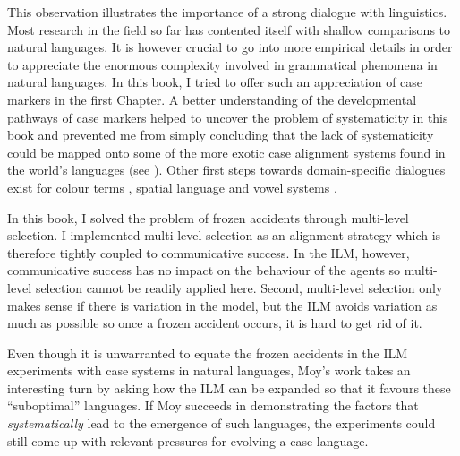 This observation illustrates the importance of a strong dialogue with linguistics. Most research in the field so far has contented itself with shallow comparisons to natural languages. It is however crucial to go into more empirical details in order to appreciate the enormous complexity involved in grammatical phenomena in natural languages. In this book, I tried to offer such an appreciation of case markers in the first Chapter. A better understanding of the developmental pathways of case markers helped to uncover the problem of systematicity in this book and prevented me from simply concluding that the lack of systematicity could be mapped onto some of the more exotic case alignment systems found in the world's languages (see ). Other first steps towards domain-specific dialogues exist for colour terms \citep{steels05coordinating}, spatial language \citep{loetzsch08typological} and vowel systems \citep{deboer99self}.

In this book, I solved the problem of frozen accidents through multi-level selection. I implemented multi-level selection as an alignment strategy which is therefore tightly coupled to communicative success. In the ILM, however, communicative success has no impact on the behaviour of the agents so multi-level selection cannot be readily applied here. Second, multi-level selection only makes sense if there is variation in the model, but the ILM avoids variation as much as possible so once a frozen accident occurs, it is hard to get rid of it.
 
\largerpage[-2]
Even though it is unwarranted to equate the frozen accidents in the ILM experiments with case systems in natural languages, Moy's work takes an interesting turn by asking how the ILM can be expanded so that it favours these ``suboptimal'' languages. If Moy succeeds in demonstrating the factors that {\em systematically} lead to the emergence of such languages, the experiments could still come up with relevant pressures for evolving a case language.

